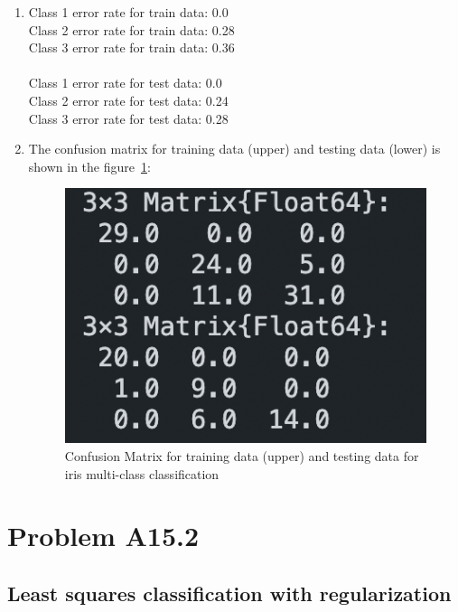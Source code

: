 \documentclass{article}
\begin{document}
    \begin{enumerate}[label=(\alph*)]
        \item Class 1 error rate for train data: 0.0\\
Class 2 error rate for train data: 0.28\\
Class 3 error rate for train data: 0.36\\\\
Class 1 error rate for test data: 0.0\\
Class 2 error rate for test data: 0.24\\
Class 3 error rate for test data: 0.28\\
        \item The confusion matrix for training data (upper) and testing data (lower) is shown in the figure~\ref{fig:conf_matrix}:
        \begin{figure}[h]
            \centering
            \includegraphics{Train_Test_Conf.png}
            \caption{Confusion Matrix for training data (upper) and testing data for iris multi-class classification}
            \label{fig:conf_matrix}
        \end{figure}
    \end{enumerate}
\section*{Problem A15.2}
\subsection*{Least squares classification with regularization}
\end{document}

